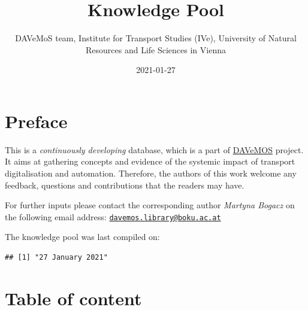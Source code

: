 \documentclass[
]{book}
\title{Knowledge Pool}
\author{DAVeMoS team, Institute for Transport Studies (IVe), University of Natural Resources and Life Sciences in Vienna}
\date{2021-01-27}
\begin{document}
\maketitle

{
\setcounter{tocdepth}{1}
\tableofcontents
}
\hypertarget{preface}{%
\chapter*{Preface}\label{preface}}

This is a \emph{continuously developing} database, which is a part of \href{https://www.davemos.online/}{DAVeMOS} project. It aims at gathering concepts and evidence of the systemic impact of transport digitalisation and automation. Therefore, the authors of this work welcome any feedback, questions and contributions that the readers may have.

For further inputs please contact the corresponding author \emph{Martyna Bogacz} on the following email address: \href{mailto:davemos.library@boku.ac.at}{\nolinkurl{davemos.library@boku.ac.at}}

The knowledge pool was last compiled on:

\begin{verbatim}
## [1] "27 January 2021"
\end{verbatim}

\hypertarget{table-of-content}{%
\chapter*{Table of content}\label{table-of-content}}
\end{document}
